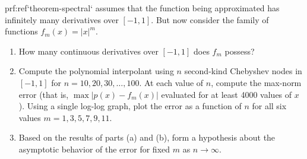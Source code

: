 \begin{exercise}
    {prf:ref}`theorem-spectral` assumes that the function being approximated has infinitely many derivatives over $[-1,1]$. But now consider the family of functions $f_m(x)=|x|^m$. 
    \begin{enumerate}
        \item How many continuous derivatives over $[-1,1]$ does $f_m$ possess?
        \item Compute the polynomial interpolant using $n$ second-kind Chebyshev nodes in $[-1,1]$ for $n=10,20,30,\ldots,100$. At each value of $n$, compute the max-norm error (that is, $\max |p(x)-f_m(x)|$ evaluated for at least 4000 values of $x$). Using a single log-log graph, plot the error as a function of $n$ for all six values $m=1,3,5,7,9,11$.
        \item Based on the results of parts (a) and (b), form a hypothesis about the asymptotic behavior of the error for fixed $m$ as $n\rightarrow \infty$. 
    \end{enumerate}

\end{exercise}


